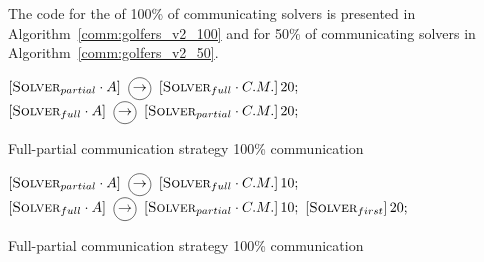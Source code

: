 The code for the \commstr{} of 100\% of communicating solvers is presented in Algorithm~\ref{comm:golfers_v2_100} and for 50\% of communicating solvers in Algorithm~\ref{comm:golfers_v2_50}. 

\begin{algorithm}[H]
\dontprintsemicolon
\SetNoline
$\left[\eqsolverposl{partial}\cdot A\right] \onetoone \left[\eqsolverposl{full}\cdot C.M.\right]20;$\;
$\left[\eqsolverposl{full}\cdot A\right] \onetoone \left[\eqsolverposl{partial}\cdot C.M.\right]20;$
\caption{Full-partial communication strategy 100\% communication}\label{comm:golfers_v2_100}
\end{algorithm}

\begin{algorithm}[H]
\dontprintsemicolon
\SetNoline
$\left[\eqsolverposl{partial}\cdot A\right] \onetoone \left[\eqsolverposl{full}\cdot C.M.\right]10;$\;
$\left[\eqsolverposl{full}\cdot A\right] \onetoone \left[\eqsolverposl{partial}\cdot C.M.\right]10;$\;
$\left[\textbf{{\sc Solver}}_{first}\right]20;$\;
\caption{Full-partial communication strategy 100\% communication}\label{comm:golfers_v2_50}
\end{algorithm}

\begin{table}
\captionsetup{belowskip=6pt,aboveskip=6pt}
\centering 
\renewcommand{\arraystretch}{1}
\caption{Full-partial \commstr{} with communication \oneTn}
\label{tab:golfers_v2_1N}
\end{table}

